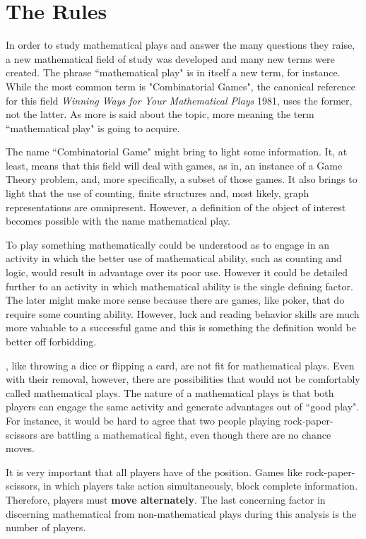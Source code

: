 \section*{The Rules}

In order to study mathematical plays and answer the many questions they raise, a new mathematical field of study was developed and many new terms were created. The phrase ``mathematical play" is in itself a new term, for instance. While the most common term is "Combinatorial Games", the canonical reference for this field \textit{Winning Ways for Your Mathematical Plays} 1981, uses the former, not the latter. As more is said about the topic, more meaning the term ``mathematical play" is going to acquire.

The name ``Combinatorial Game" might bring to light some information. It, at least, means that this field will deal with games, as in, an instance of a Game Theory problem, and, more specifically, a subset of those games. It also brings to light that the use of counting, finite structures and, most likely, graph representations are omnipresent. However, a definition of the object of interest becomes possible with the name mathematical play.

To play something mathematically could be understood as to engage in an activity in which the better use of mathematical ability, such as counting and logic, would result in advantage over its poor use. However it could be detailed further to an activity in which mathematical ability is the single defining factor. The later might make more sense because there are games, like poker, that do require some counting ability. However, luck and reading behavior skills are much more valuable to a successful game and this is something the definition would be better off forbidding.

, like throwing a dice or flipping a card, are not fit for mathematical plays. Even with their removal, however, there are possibilities that would not be comfortably called mathematical plays. The nature of a mathematical plays is that both players can engage the same activity and generate advantages out of ``good play". For instance, it would be hard to agree that two people playing rock-paper-scissors are battling a mathematical fight, even though there are no chance moves.

It is very important that all players have  of the position. Games like rock-paper-scissors, in which players take action simultaneously, block complete information. Therefore, players must \textbf{move alternately}. The last concerning factor in discerning mathematical from non-mathematical plays during this analysis is the number of players.

